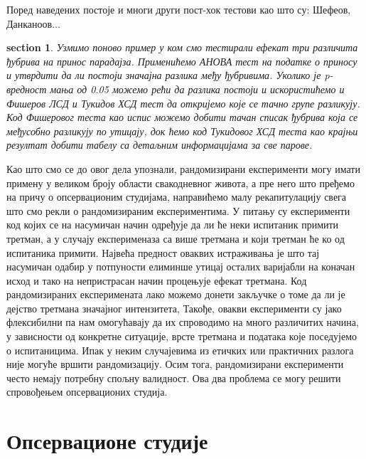 \documentclass[12pt, a4paper]{article}
\newtheorem{primer}[Пример]{section}
\begin{document}
Поред наведених постоје и многи други пост-хок тестови као што су: Шефеов, Данканоов... 

\begin{primer}
Узмимо поново пример у ком смо тестирали ефекат три различита ђубрива на принос парадајза. Применићемо 
АНОВА тест на податке о приносу и утврдити да ли постоји значајна разлика међу ђубривима. Уколико 
је p-вредност мања од 0.05 можемо рећи да разлика постоји и искористићемо и Фишеров ЛСД и Тукидов 
ХСД тест да откријемо које се тачно групе разликују. Код Фишеровог теста као испис можемо добити 
тачан списак ђубрива која се међусобно разликују по утицају, док ћемо код Тукидовог ХСД теста као 
крајњи резултат добити табелу са детаљним информацијама за све парове.
\end{primer}

Као што смо се до овог дела упознали, рандомизирани експерименти могу имати примену у великом 
броју области свакодневног живота, а пре него што пређемо на причу о опсервационим студијама, 
направићемо малу рекапитулацију свега што смо рекли о рандомизираним експериментима.
У питању су експерименти код којих се на насумичан начин одређује да ли ће неки испитаник примити 
третман, а у случају експерименаза са више третмана и који третман ће ко од испитаника примити.
Највећа предност оваквих истраживања је што тај насумичан одабир у потпуности елиминше утицај 
осталих варијабли на коначан исход и тако на непристрасан начин процењује ефекат третмана.
Код рандомизираних експеримената лако можемо донети закључке о томе да ли је дејство третмана 
значајног интензитета,
Такође, овакви експерименти су јако флексибилни па нам омогућавају да их спроводимо на много 
различитих начина, у зависности од конкретне ситуације, врсте третмана и података које поседујемо 
о испитаницима.
Ипак у неким случајевима из етичких или практичних разлога није могуће вршити рандомизацију.
Осим тога, рандомизирани експерименти често немају потребну спољну валидност. 
Ова два проблема се могу решити спровођењем опсервационих студија.
\newpage



\section{Опсервационе студије}
\end{document}
